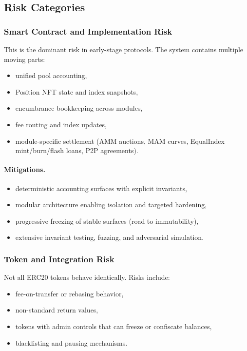 \documentclass[version=preprint]{iacrcc}
\begin{document}
\subsection{Risk Categories}

\subsubsection{Smart Contract and Implementation Risk}

This is the dominant risk in early-stage protocols. The system contains multiple moving parts:
\begin{itemize}
  \item unified pool accounting,
  \item Position NFT state and index snapshots,
  \item encumbrance bookkeeping across modules,
  \item fee routing and index updates,
  \item module-specific settlement (AMM auctions, MAM curves, EqualIndex mint/burn/flash loans, P2P agreements).
\end{itemize}

\paragraph{Mitigations.}
\begin{itemize}
  \item deterministic accounting surfaces with explicit invariants,
  \item modular architecture enabling isolation and targeted hardening,
  \item progressive freezing of stable surfaces (road to immutability),
  \item extensive invariant testing, fuzzing, and adversarial simulation.
\end{itemize}

\subsubsection{Token and Integration Risk}

Not all ERC20 tokens behave identically. Risks include:
\begin{itemize}
  \item fee-on-transfer or rebasing behavior,
  \item non-standard return values,
  \item tokens with admin controls that can freeze or confiscate balances,
  \item blacklisting and pausing mechanisms.
\end{itemize}
\end{document}
